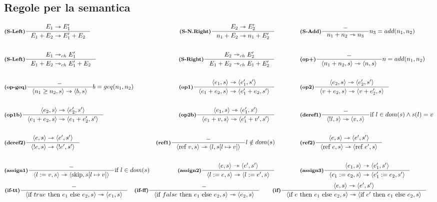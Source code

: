 \documentclass[a4paper, 10pt]{article}
\newcommand{\infer}[4]{\inference[\textbf{#1}]{#2}{#3}#4 }
\newcommand{\srule}[2]{\langle #1 \rangle \rightarrowtriangle \langle #2 \rangle}
\newcommand{\memrep}[3]{#1 \lbrack #2 \mapsto #3 \rbrack}
\newcommand{\goesto}{\rightarrowtriangle}
\begin{document}
\subsection*{Regole per la semantica}
	\begin{align*}
		&\infer{(S-Left)}{E_1 \goesto E_1' }{E_1 + E_2 \goesto E_1' + E_2}{} 
		&\infer{(S-N.Right)}{E_2 \goesto E_2'}{n_1 + E_2 \goesto n_1 + E_2'}{} \qquad\qquad
		&\infer{(S-Add)}{-}{n_1+n_2 \goesto n_3}{n_3 = add(n_1, n_2)} \\ \\
		&\infer{(S-Left)}{E_1 \goesto_{ch} E_1'}{E_1 + E_2 \goesto_{ch} E_1' + E_2}{} 
		&\infer{(S-Right)}{E_2 \goesto_{ch} E_2'}{E_1 + E_2 \goesto_{ch} E_1 + E_2'}{} \qquad\qquad
		&\infer{(op+)}{-}{\srule{n_1 + n_2,s}{n,s}}{n=add(n_1,n_2)} \\ \\
		&\infer{(op-geq)}{-}{\srule{n_1 \geq n_2,s}{b,s}}{b=geq(n_1, n_2)} 
		&\infer{(op1)}{\srule{e_1,s}{e_1', s'}}{\srule{e_1 + e_2,s}{e_1' + e_2,s'}}{} \qquad\qquad
		&\infer{(op2)}{\srule{e_2,s}{e_2', s'}}{\srule{v + e_2,s}{v + e_2',s}}{} \\ \\
		&\infer{(op1b)}{\srule{e_2,s}{e_2', s'}}{\srule{e_1 + e_2,s}{e_1 + e_2',s'}}{} 
		&\infer{(op2b)}{\srule{e_1,s}{e_1', s'}}{\srule{e_1 + v,s}{e_1' + v',s'}}{} \qquad\qquad
		&\infer{(deref1)}{-}{\srule{!l,s}{v,s}}{\text{if } l \in dom(s) \wedge s(l)=v} \\ \\
		&\infer{(deref2)}{\srule{e,s}{e',s'}}{\srule{!e,s}{!e',s'}}{} 
		&\infer{(ref1)}{-}{\srule{\text{ref }v, s}{l, \memrep{s}{l}{v}}}{l \notin dom(s)} \qquad\qquad
		&\infer{(ref2)}{\srule{e,s}{e',s'}}{\srule{\text{ref }e,s}{\text{ref } e',s}}{}\\ \\
		&\infer{(assign1)}{-}{\srule{l:=v,s}{\text{skip}, \memrep{s}{l}{v}}}{\text{if } l \in dom(s)} 
		&\infer{(assign2)}{\srule{e,s}{e',s'}}{\srule{l:=e,s}{l:=e',s}}{} \qquad\qquad
		&\infer{(assign3)}{\srule{e_1,s}{e_1',s'}}{\srule{e_1:=e_2,s}{e_1':=e_2,s'}}{}
	\end{align*}
	\begin{align*}
		&\infer{(if-tt)}{-}{\srule{\text{if } true \text{ then } e_1 \text{ else } e_2,s}{e_1,s}}{}
		&\infer{(if-ff)}{-}{\srule{\text{if } false \text{ then } e_1 \text{ else } e_2,s}{e_2,s}}{}\qquad
		&\infer{(if)}{\srule{e,s}{e',s'}}{\srule{\text{if } e \text{ then } e_1 \text{ else } e_2,s}{\text{if } e' \text{ then } e_1 \text{ else } e_2,s}}{}
	\end{align*}
\end{document}
